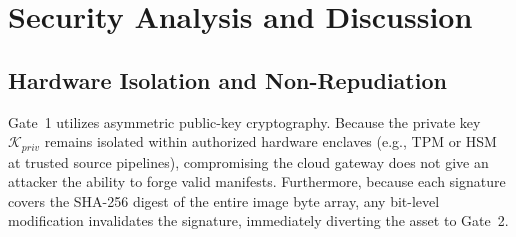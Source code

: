 \documentclass[conference]{IEEEtran}
\begin{document}
\begin{table}[t]
\caption{Case Study: Undefended VLM vs. CPS-Gateway Execution}
\label{tab:case_study}
\centering
\vspace{-1.5mm}
\vspace{1.5mm}
\end{table}

\section{Security Analysis and Discussion}
\label{sec:discussion}

\subsection{Hardware Isolation and Non-Repudiation}
Gate~1 utilizes asymmetric public-key cryptography. Because the private key $\mathcal{K}_{priv}$ remains isolated within authorized hardware enclaves (e.g., TPM or HSM at trusted source pipelines), compromising the cloud gateway does not give an attacker the ability to forge valid manifests. Furthermore, because each signature covers the SHA-256 digest of the entire image byte array, any bit-level modification invalidates the signature, immediately diverting the asset to Gate~2.
\end{document}
